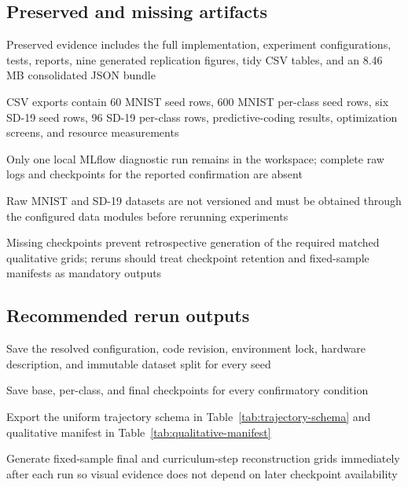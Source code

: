 \subsection{Preserved and missing artifacts}
\begin{draftpoints}
  \item Preserved evidence includes the full implementation, experiment configurations, tests, reports, nine generated replication figures, tidy CSV tables, and an 8.46 MB consolidated JSON bundle
  \item CSV exports contain 60 MNIST seed rows, 600 MNIST per-class seed rows, six SD-19 seed rows, 96 SD-19 per-class rows, predictive-coding results, optimization screens, and resource measurements
  \item Only one local MLflow diagnostic run remains in the workspace; complete raw logs and checkpoints for the reported confirmation are absent
  \item Raw MNIST and SD-19 datasets are not versioned and must be obtained through the configured data modules before rerunning experiments
  \item Missing checkpoints prevent retrospective generation of the required matched qualitative grids; reruns should treat checkpoint retention and fixed-sample manifests as mandatory outputs
\end{draftpoints}

\subsection{Recommended rerun outputs}
\begin{draftpoints}
  \item Save the resolved configuration, code revision, environment lock, hardware description, and immutable dataset split for every seed
  \item Save base, per-class, and final checkpoints for every confirmatory condition
  \item Export the uniform trajectory schema in Table~\ref{tab:trajectory-schema} and qualitative manifest in Table~\ref{tab:qualitative-manifest}
  \item Generate fixed-sample final and curriculum-step reconstruction grids immediately after each run so visual evidence does not depend on later checkpoint availability
\end{draftpoints}
